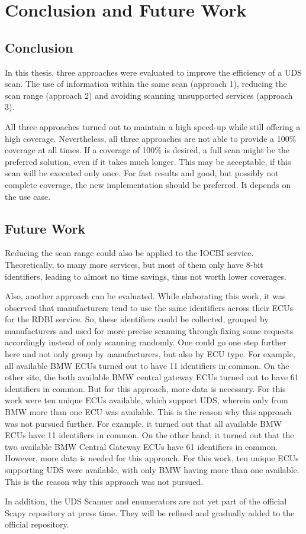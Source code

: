 \section{Conclusion and Future Work}

\subsection{Conclusion}

In this thesis, three approaches were evaluated to improve the efficiency of a UDS scan. The use of information within the same scan (approach 1), reducing the scan range (approach 2) and avoiding scanning unsupported services (approach 3).

All three approaches turned out to maintain a high speed-up while still offering a high coverage.
Nevertheless, all three approaches are not able to provide a 100\% coverage at all times. 
If a coverage of 100\% is desired, a full scan might be the preferred solution, even if it takes much longer. This may be acceptable, if this scan will be executed only once. For fast results and good, but possibly not complete coverage, the new implementation should be preferred. It depends on the use case.

\subsection{Future Work}

Reducing the scan range could also be applied to the IOCBI service. Theoretically, to many more services, but most of them only have 8-bit identifiers, leading to almost no time savings, thus not worth lower coverages.

Also, another approach can be evaluated. While elaborating this work, it was observed that manufacturers tend to use the same identifiers across their ECUs for the RDBI service. So, these identifiers could be collected, grouped by manufacturers and used for more precise scanning through fixing some requests accordingly instead of only scanning randomly. One could go one step further here and not only group by manufacturers, but also by ECU type.
For example, all available BMW ECUs turned out to have 11 identifiers in common. On the other site, the both available BMW central gateway ECUs turned out to have 61 identifiers in common. But for this approach, more data is necessary. For this work were ten unique ECUs available, which support UDS, wherein only from BMW more than one ECU was available. This is the reason why this approach was not pursued further.
For example, it turned out that all available BMW ECUs have 11 identifiers in common. On the other hand, it turned out that the two available BMW Central Gateway ECUs have 61 identifiers in common. However, more data is needed for this approach. For this work, ten unique ECUs supporting UDS were available, with only BMW having more than one available. This is the reason why this approach was not pursued.

In addition, the UDS Scanner and enumerators are not yet part of the official Scapy repository at press time. They will be refined and gradually added to the official repository.
